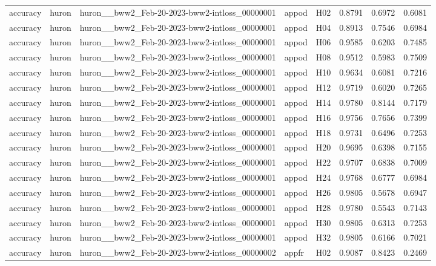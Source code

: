 \begin{table}[tbp]
\begin{tabular}{lllllrrr}
accuracy & huron & huron\_\_bww2\_Feb-20-2023-bww2-intloss\_00000001 & appod & H02 & 0.8791 & 0.6972 & 0.6081 \\
accuracy & huron & huron\_\_bww2\_Feb-20-2023-bww2-intloss\_00000001 & appod & H04 & 0.8913 & 0.7546 & 0.6984 \\
accuracy & huron & huron\_\_bww2\_Feb-20-2023-bww2-intloss\_00000001 & appod & H06 & 0.9585 & 0.6203 & 0.7485 \\
accuracy & huron & huron\_\_bww2\_Feb-20-2023-bww2-intloss\_00000001 & appod & H08 & 0.9512 & 0.5983 & 0.7509 \\
accuracy & huron & huron\_\_bww2\_Feb-20-2023-bww2-intloss\_00000001 & appod & H10 & 0.9634 & 0.6081 & 0.7216 \\
accuracy & huron & huron\_\_bww2\_Feb-20-2023-bww2-intloss\_00000001 & appod & H12 & 0.9719 & 0.6020 & 0.7265 \\
accuracy & huron & huron\_\_bww2\_Feb-20-2023-bww2-intloss\_00000001 & appod & H14 & 0.9780 & 0.8144 & 0.7179 \\
accuracy & huron & huron\_\_bww2\_Feb-20-2023-bww2-intloss\_00000001 & appod & H16 & 0.9756 & 0.7656 & 0.7399 \\
accuracy & huron & huron\_\_bww2\_Feb-20-2023-bww2-intloss\_00000001 & appod & H18 & 0.9731 & 0.6496 & 0.7253 \\
accuracy & huron & huron\_\_bww2\_Feb-20-2023-bww2-intloss\_00000001 & appod & H20 & 0.9695 & 0.6398 & 0.7155 \\
accuracy & huron & huron\_\_bww2\_Feb-20-2023-bww2-intloss\_00000001 & appod & H22 & 0.9707 & 0.6838 & 0.7009 \\
accuracy & huron & huron\_\_bww2\_Feb-20-2023-bww2-intloss\_00000001 & appod & H24 & 0.9768 & 0.6777 & 0.6984 \\
accuracy & huron & huron\_\_bww2\_Feb-20-2023-bww2-intloss\_00000001 & appod & H26 & 0.9805 & 0.5678 & 0.6947 \\
accuracy & huron & huron\_\_bww2\_Feb-20-2023-bww2-intloss\_00000001 & appod & H28 & 0.9780 & 0.5543 & 0.7143 \\
accuracy & huron & huron\_\_bww2\_Feb-20-2023-bww2-intloss\_00000001 & appod & H30 & 0.9805 & 0.6313 & 0.7253 \\
accuracy & huron & huron\_\_bww2\_Feb-20-2023-bww2-intloss\_00000001 & appod & H32 & 0.9805 & 0.6166 & 0.7021 \\
accuracy & huron & huron\_\_bww2\_Feb-20-2023-bww2-intloss\_00000002 & appfr & H02 & 0.9087 & 0.8423 & 0.2469 \\

\end{tabular}
\end{table}
